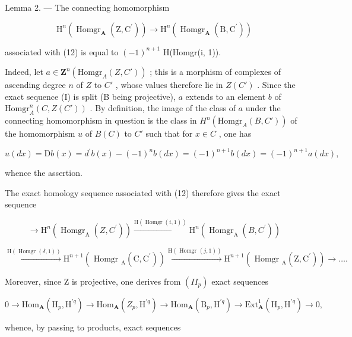 Lemma 2. --- The connecting homomorphism

\[
\mathrm{H} ^ {n} \left(\operatorname{Homgr} _ {\mathbf {A}} \left(\mathrm{Z}, \mathrm{C} ^ {\prime}\right)\right)\rightarrow \mathrm{H} ^ {n} \left(\operatorname{Homgr} _ {\mathbf {A}} \left(\mathrm{B}, \mathrm{C} ^ {\prime}\right)\right)
\]

associated with (12) is equal to \((-1)^{n+1}\) H(Homgr(i, 1)).

Indeed, let \(a \in \mathbf{Z}^n(\text{Homgr}_A(Z, C'))\) ; this is a morphism of complexes of ascending degree \(n\) of \(Z\) to \(C'\) , whose values therefore lie in \(Z(C')\) . Since the exact sequence (I) is split (B being projective), \(a\) extends to an element \(b\) of \(\text{Homgr}_A^n(C, Z(C'))\) . By definition, the image of the class of \(a\) under the connecting homomorphism in question is the class in \(H^n(\text{Homgr}_A(B, C'))\) of the homomorphism \(u\) of \(B(C)\) to \(C'\) such that for \(x \in C\) , one has

\[
u (d x) = \mathrm{D} b (x) = d ^ {\prime} b (x) - (- 1) ^ {n} b (d x) = (- 1) ^ {n + 1} b (d x) = (- 1) ^ {n + 1} a (d x),
\]

whence the assertion.

The exact homology sequence associated with (12) therefore gives the exact sequence

\[
\rightarrow \mathrm{H} ^ {n} (\operatorname{Homgr} _ {\mathrm{A}} (Z, C ^ {\prime})) \xrightarrow {\mathrm{H} (\operatorname{Homgr} (i , 1))} \mathrm{H} ^ {n} (\operatorname{Homgr} _ {\mathrm{A}} (B, C ^ {\prime}))
\]

\[
\xrightarrow {\mathrm{H} (\text { Homgr } (\delta , 1))} \mathrm{H} ^ {n + 1} \left(\text { Homgr } _ {\mathrm{A}} \left(\mathrm{C}, \mathrm{C} ^ {\prime}\right)\right) \xrightarrow {\mathrm{H} (\text { Homgr } (j , 1))} \mathrm{H} ^ {n + 1} \left(\text { Homgr } _ {\mathrm{A}} \left(\mathrm{Z}, \mathrm{C} ^ {\prime}\right)\right)\rightarrow \dots .
\]

Moreover, since Z is projective, one derives from \((II_{p})\) exact sequences

\[
0 \to \mathrm{Hom} _ {\mathbf {A}} (\mathrm{H} _ {p}, \mathrm{H} ^ {\prime q}) \to \mathrm{Hom} _ {\mathbf {A}} (Z _ {p}, \mathrm{H} ^ {\prime q}) \to \mathrm{Hom} _ {\mathbf {A}} (\mathrm{B} _ {p}, \mathrm{H} ^ {\prime q}) \to \mathrm{Ext} _ {\mathbf {A}} ^ {1} (\mathrm{H} _ {p}, \mathrm{H} ^ {\prime q}) \to 0,
\]

whence, by passing to products, exact sequences

